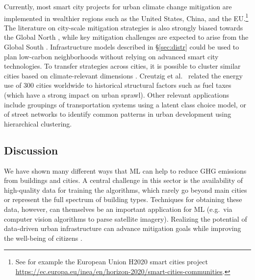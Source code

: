 \documentclass[11pt]{report}
\newcommand{\et}{et al.~}
\begin{document}
Currently, most smart city projects for urban climate change mitigation are implemented in wealthier regions such as the United States, China, and the EU.\footnote{See for example the European Union H2020 smart cities project  \url{https://ec.europa.eu/inea/en/horizon-2020/smart-cities-communities}.} 
The literature on city-scale mitigation strategies is also strongly biased towards the Global North \cite{lamb2019learning}, while key mitigation challenges are expected to arise from the Global South \cite{nagendra2018urban}. Infrastructure models described in \S\ref{sec:distr} could be used to plan low-carbon neighborhoods without relying on advanced smart city technologies. To transfer strategies across cities, it is possible to cluster similar cities based on climate-relevant dimensions  \cite{han_1_nodate,louf_typology_2014}. Creutzig \et \cite{creutzig_global_2015} related the energy use of 300 cities worldwide to historical structural factors such as fuel taxes (which have a strong impact on urban sprawl).  Other relevant applications include groupings of transportation systems \cite{han_1_nodate} using a latent class choice model, or of street networks \cite{louf_typology_2014} to identify common patterns in urban development using hierarchical clustering.

\subsection{Discussion}
We have shown many different ways that ML can help to reduce GHG emissions from buildings and cities. A central challenge in this sector is the availability of high-quality data for training the algorithms, which rarely go beyond main cities or represent the full spectrum of building types. Techniques for obtaining these data, however, can themselves be an important application for ML (e.g.~via computer vision algorithms to parse satellite imagery). Realizing the potential of data-driven urban infrastructure can advance mitigation goals while improving the well-being of citizens \cite{urge2013energy,bai2018six,creutzig_urban_2016}.

% 
% 
\end{document}
